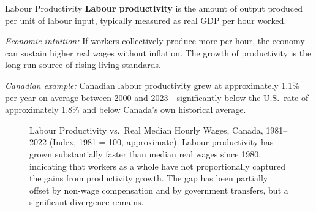 \begin{defbox}{Labour Productivity}
\textbf{Labour productivity} is the amount of output produced per unit of labour input, typically measured as real GDP per hour worked.

\textit{Economic intuition:} If workers collectively produce more per hour, the economy can sustain higher real wages without inflation. The growth of productivity is the long-run source of rising living standards.

\textit{Canadian example:} Canadian labour productivity grew at approximately 1.1\% per year on average between 2000 and 2023---significantly below the U.S.\ rate of approximately 1.8\% and below Canada's own historical average.
\end{defbox}

\begin{figure}[H]
\centering
{}
\caption{Labour Productivity vs.\ Real Median Hourly Wages, Canada, 1981--2022 (Index,
  1981 = 100, approximate). Labour productivity has grown substantially faster than median
  real wages since 1980, indicating that workers as a whole have not proportionally captured
  the gains from productivity growth. The gap has been partially offset by non-wage
  compensation and by government transfers, but a significant divergence remains.}
\label{fig:productivity_wages}
\end{figure}

